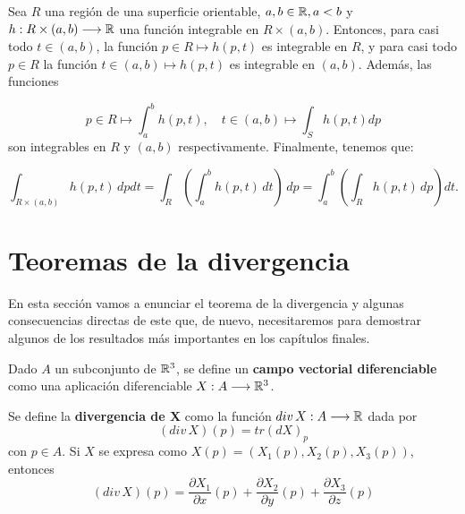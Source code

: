 \begin{theorem}
Sea $R$ una región de una superficie orientable, $a,b \in \mathbb{R}, a < b$ y $h:R \times (a,b) \longrightarrow \mathbb{R}$ una función integrable en $R \times (a,b)$. Entonces, para casi todo $t \in (a,b)$, la función $p \in R \mapsto h(p,t)$ es integrable en $R$, y para casi todo $p \in R$ la función $t \in (a,b) \mapsto h(p,t)$ es integrable en $(a,b)$. Además, las funciones

\begin{equation*}
    p \in R \mapsto \int_a^b h(p,t), \quad  t \in (a,b) \mapsto \int_S h(p,t) dp
\end{equation*}
%
son integrables en $R$ y $(a,b)$ respectivamente. Finalmente, tenemos que:

\begin{equation*}
    \int_{R \times (a,b)} h(p,t) \, dpdt = \int_R \left( \int_a^b h(p,t) \, dt \right) \, dp = \int_a^b \left( \int_R h(p,t) \, dp \right) dt.
\end{equation*}
\end{theorem}


\section{Teoremas de la divergencia}
En esta sección vamos a enunciar el teorema de la divergencia y algunas consecuencias directas de este que, de nuevo, necesitaremos para demostrar algunos de los resultados más importantes en los capítulos finales.

\begin{definition}
Dado $A$ un subconjunto de $\mathbb{R}^3$, se define un \textbf{campo vectorial diferenciable} como una aplicación diferenciable $X: A \longrightarrow \mathbb{R}^3$.
\end{definition}

\begin{definition}
Se define la \textbf{divergencia de X} como la función $div \, X: A \longrightarrow \mathbb{R}$ dada por 
%
\begin{equation*}
    (div \, X)(p) = tr (dX)_p
\end{equation*}
%
con $p \in A$. Si $X$ se expresa como $X(p) = (X_1(p), X_2(p), X_3(p))$, entonces
%
\begin{equation*}
    (div \, X)(p) = \frac{\partial X_1}{\partial x}(p) + \frac{\partial X_2}{\partial y}(p) + \frac{\partial X_3}{\partial z}(p)
\end{equation*}
%
\end{definition}


